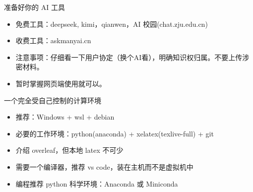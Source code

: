 \documentclass[10pt,aspectratio=169]{beamer}
\begin{document}
\begin{frame}{准备好你的 AI 工具}
    \begin{itemize}
        \item<1-> 免费工具：deepseek, kimi，qianwen，AI 校园(chat.zju.edu.cn)
        \item<2-> 收费工具：askmanyai.cn
        \item<3-> 注意事项：仔细看一下用户协定（换个AI看），明确知识权归属。不要上传涉密材料。
        \item<4-> 暂时掌握网页端使用就可以。
    \end{itemize}

\end{frame}

\begin{frame}{一个完全受自己控制的计算环境}
\begin{itemize}
    \item 推荐：Windows + wsl + debian
    \item 必要的工作环境：python(anaconda) + xelatex(texlive-full) + git
    \item 介绍 overleaf，但本地 latex 不可少
    \item 需要一个编译器，推荐 vs code，装在主机而不是虚拟机中
    \item 编程推荐 python 科学环境：Anaconda 或 Miniconda
\end{itemize}
\end{frame}
\end{document}
